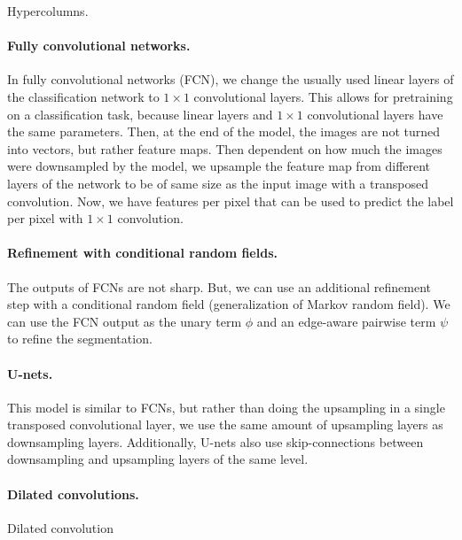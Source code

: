 \begin{marginfigure}
    \centering
    \caption{Hypercolumns.}
    \label{fig:hypercolumns}
\end{marginfigure}

\paragraph{Fully convolutional networks.}

In fully convolutional networks (FCN), we change the usually used linear layers
of the classification network to $1\times 1$ convolutional layers. This allows
for pretraining on a classification task, because linear layers and $1\times 1$
convolutional layers have the same parameters. Then, at the end of the model,
the images are not turned into vectors, but rather feature maps. Then dependent
on how much the images were downsampled by the model, we upsample the feature
map from different layers of the network to be of same size as the input image
with a transposed convolution. Now, we have features per pixel that can be used
to predict the label per pixel with $1\times 1$ convolution.

\paragraph{Refinement with conditional random fields.}

The outputs of FCNs are not sharp. But, we can use an additional refinement
step with a conditional random field (generalization of Markov random field).
We can use the FCN output as the unary term $\phi$ and an edge-aware pairwise
term $\psi$ to refine the segmentation.

\paragraph{U-nets.}

This model is similar to FCNs, but rather than doing the upsampling in a single
transposed convolutional layer, we use the same amount of upsampling layers as
downsampling layers. Additionally, U-nets also use skip-connections between
downsampling and upsampling layers of the same level.

\paragraph{Dilated convolutions.}

\begin{marginfigure}
    \centering
    \caption{Dilated convolution}
    \label{fig:dilated-convolution}
\end{marginfigure}

